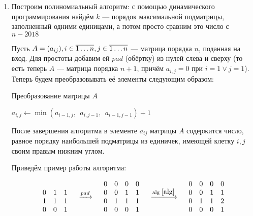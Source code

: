 \documentclass[a4paper,12pt]{article}
\begin{document}
\begin{solution}
\begin{enumerate}
		\item Построим полиномиальный алгоритм: с помощью динамического программирования найдём $k$ --- порядок максимальной подматрицы, заполненный одними единицами, а потом просто сравним это число с $n-2018$
		
		Пусть $A = (a_{ij}), i \in \overline{1\ldots n}, j \in \overline{1\ldots n}$ --- матрица порядка $n$, поданная на вход. Для простоты добавим ей $pad$ (обёртку) из нулей слева и сверху (то есть теперь $A$ --- матрица порядка $n+1$, причём $a_{i,j} = 0$ при $i = 1 \vee j=1$). Теперь будем преобразовывать её элементы следующим образом: 
		
		\begin{algorithm}
			\caption{Преобразование матрицы $A$}\label{alg}
			\begin{algorithmic}
				
				\State $a_{i,j} \leftarrow \min(a_{i-1,j}, \ \ a_{i,j-1}, \ \ a_{i-1,j-1}) + 1$
				\EndIf
				\EndFor
				\EndFor
				
			\end{algorithmic}
		\end{algorithm}
	
		После завершения алгоритма в элементе $a_{ij}$ матрицы $A$ содержится число, равное порядку наибольшей подматрицы из единичек, имеющей клетку $i, j$ своим правым нижним углом.
		
		Приведём пример работы алгоритма:
		
		\begin{equation*}
		\begin{matrix}
		\\
		0 & 1 & 1  \\
		1 & 1 & 1  \\
		0 & 0 & 1  \\
		\end{matrix}
		\ \ \ \ \xrightarrow{pad} \ \ \ \
		\begin{matrix}
		0 & 0 & 0 & 0 \\
		0 & 0 & 1 & 1 \\
		0 & 1 & 1 & 1  \\
		0 & 0 & 0 & 1  \\
		\end{matrix}
		\ \ \ \ \xrightarrow{\text{alg }\ref{alg}} \ \ \ \ 
		\begin{matrix}
		0 & 0 & 0 & 0 \\
		0 & 0 & 1 & 1 \\
		0 & 1 & 1 & 2  \\
		0 & 0 & 0 & 1  \\
		\end{matrix}
		\end{equation*}
		

\end{enumerate}
\end{solution}
\end{document}
